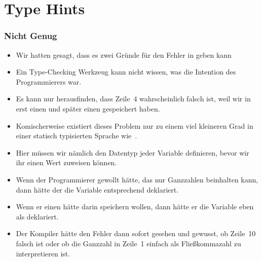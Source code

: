 \documentclass[aspectratio=169,mathserif,notheorems]{beamer}%
\begin{document}
\section{Type Hints}%
%
\begin{frame}%
\frametitle{Nicht Genug}%
\begin{itemize}%
\item Wir hatten gesagt, dass es zwei Gründe für den Fehler in  geben kann%
%
\item<4-> Ein Type-Checking Werkzeug kann nicht wissen, was die Intention des Programmierers war.%
\item<5-> Es kann nur herausfinden, dass Zeile~4 wahrscheinlich falsch ist, weil wir in  erst einen  und später einen  gespeichert haben.%
%
\item<7-> Komischerweise existiert dieses Problem nur zu einem viel kleineren Grad in einer statisch typisierten Sprache wie~.%
\item<8-> Hier müssen wir nämlich den Datentyp jeder Variable definieren, bevor wir ihr einen Wert zuweisen können.%
\item<9-> Wenn der Programmierer gewollt hätte, das  nur Ganzzahlen beinhalten kann, dann hätte der die Variable entsprechend deklariert.%
\item<10-> Wenn er einen  hätte darin speichern wollen, dann hätte er die Variable eben als  deklariert.%
\item<11-> Der Kompiler hätte den Fehler dann sofort gesehen und gewusst, ob Zeile~10 falsch ist oder ob die Ganzzahl in Zeile~1 einfach als Fließkommazahl zu interpretieren ist.%
\end{itemize}%
%
\end{frame}%
%
\end{document}
